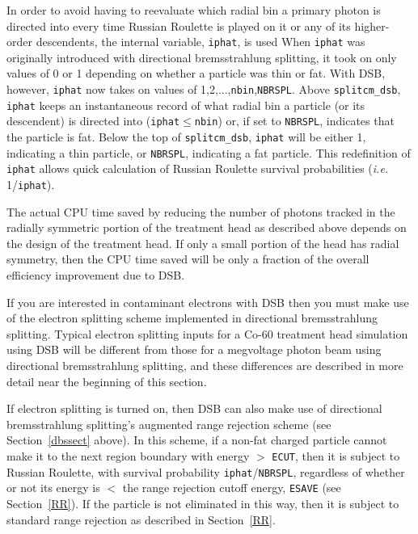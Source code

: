 \documentclass[12pt,twoside]{article}
\begin{document}
In order to avoid having to reevaluate which radial bin a primary photon is directed into every time Russian
Roulette is played on it or any of its higher-order descendents, the internal variable, {\tt iphat}, is used
When {\tt iphat} was originally introduced with directional bremsstrahlung splitting, it took on only values of 0 or 1
depending on whether a particle was thin
or fat.  With DSB, however, {\tt iphat} now takes on values of 1,2,...,{\tt nbin},{\tt NBRSPL}.
Above {\tt splitcm\_dsb}, {\tt iphat} keeps an instantaneous record of what radial bin a particle (or its descendent)
is directed into ({\tt iphat}$\leq${\tt nbin}) or, if set to {\tt NBRSPL}, indicates that the particle is fat.
Below the top of {\tt splitcm\_dsb}, {\tt iphat} will be either 1, indicating a thin particle, or {\tt NBRSPL}, indicating a fat particle.  This redefinition of {\tt iphat} allows quick calculation of Russian Roulette survival
probabilities ({\em i.e.} 1/{\tt iphat}).

The actual CPU time saved by reducing the number of photons tracked in the radially symmetric portion of
the treatment head as described above depends on the design of the treatment head.  If only a small portion
of the head has radial symmetry, then the CPU time saved will be only a fraction of the overall efficiency
improvement due to DSB.

If you are interested in contaminant electrons with DSB then you must make use of
the electron splitting scheme implemented in directional bremsstrahlung splitting.  Typical electron splitting
inputs for a Co-60 treatment head simulation using DSB will be different from those for a megvoltage
photon beam using directional bremsstrahlung splitting, and these differences are described in more detail near
the beginning of this section.

If electron splitting is turned on, then DSB can also make use of directional bremsstrahlung splitting's augmented range rejection scheme (see Section~\ref{dbssect} above).  In this scheme, if a non-fat charged particle cannot make it to
the next region boundary with energy $>$ {\tt ECUT}, then it is subject to Russian Roulette, with survival
probability {\tt iphat}/{\tt NBRSPL}, regardless of whether or not its energy is $<$ the range rejection cutoff
energy, {\tt ESAVE} (see Section~\ref{RR}).  If the particle is not eliminated in this way, then
it is subject to standard range rejection as described in Section~\ref{RR}.
\end{document}
